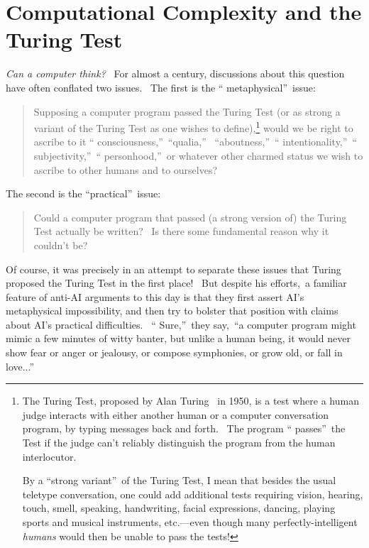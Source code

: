 \documentclass[12pt,onecolumn]{article}%
\begin{document}
\section{Computational Complexity and the Turing Test\label{AI}}

\textit{Can a computer think?} \ For almost a century, discussions about this
question have often conflated two issues. \ The first is the \textquotedblleft
metaphysical\textquotedblright\ issue:

\begin{quotation}
\noindent Supposing a computer program passed the Turing Test (or as strong a
variant of the Turing Test as one wishes to define),\footnote{The Turing Test,
proposed by Alan Turing \cite{turing:ai}\ in 1950, is a test where a human
judge interacts with either another human or a computer conversation program,
by typing messages back and forth. \ The program \textquotedblleft
passes\textquotedblright\ the Test if the judge can't reliably distinguish the
program from the human interlocutor.
\par
By a \textquotedblleft strong variant\textquotedblright\ of the Turing Test, I
mean that besides the usual teletype conversation, one could add additional
tests requiring vision, hearing, touch, smell, speaking, handwriting, facial
expressions, dancing, playing sports and musical instruments, etc.---even
though many perfectly-intelligent \textit{humans} would then be unable to pass
the tests!} would we be right to ascribe to it \textquotedblleft
consciousness,\textquotedblright\ \textquotedblleft qualia,\textquotedblright%
\ \textquotedblleft aboutness,\textquotedblright\ \textquotedblleft
intentionality,\textquotedblright\ \textquotedblleft
subjectivity,\textquotedblright\ \textquotedblleft
personhood,\textquotedblright\ or whatever other charmed status we wish to
ascribe to other humans and to ourselves?
\end{quotation}

The second is the \textquotedblleft practical\textquotedblright\ issue:

\begin{quotation}
\noindent Could a computer program that passed (a strong version of) the
Turing Test actually be written? \ Is there some fundamental reason why it
couldn't be?
\end{quotation}

Of course, it was precisely in an attempt to separate these issues that Turing
proposed the Turing Test in the first place! \ But despite his efforts,\ a
familiar feature of anti-AI arguments to this day is that they first assert
AI's metaphysical impossibility, and then try to bolster that position with
claims about AI's practical difficulties. \ \textquotedblleft
Sure,\textquotedblright\ they say,\ \textquotedblleft a computer program might
mimic a few minutes of witty banter, but unlike a human being, it would never
show fear or anger or jealousy, or compose symphonies, or grow old, or fall in
love...\textquotedblright
\end{document}
